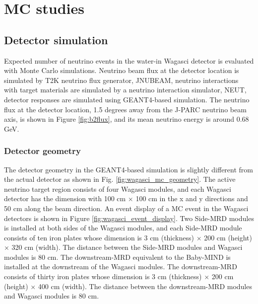 \section{MC studies}
\label{sec:mc_study}

\subsection{Detector simulation}
Expected number of neutrino events in the water-in Wagasci detector is evaluated with Monte Carlo simulations. 
Neutrino beam flux at the detector location is simulated by T2K neutrino flux generator, JNUBEAM, neutrino interactions with target materials are simulated by a neutrino interaction simulator, NEUT, detector responses are simulated using GEANT4-based simulation.
The neutrino flux at the detector location, 1.5 degrees away from the J-PARC neutrino beam axis, is shown in Figure \ref{fig:b2flux}, and its mean neutrino energy is around 0.68 GeV.


\subsubsection{Detector geometry}
The detector geometry in the GEANT4-based simulation is slightly different from the actual detector as shown in Fig. \ref{fig:wagasci_mc_geometry}.
The active neutrino target region consists of four Wagasci modules, and each Wagasci detector has the dimension with 100 cm $\times$ 100 cm in the x and y directions and 50 cm along the beam direction.
An event display of a MC event in the Wagasci detectors is shown in Figure \ref{fig:wagasci_event_display}.
Two Side-MRD modules is installed at both sides of the Wagasci modules, and each Side-MRD module consists of ten iron plates whose dimension is 3 cm (thickness) $\times$ 200 cm (height) $\times$ 320 cm (width). 
The distance between the Side-MRD modules and Wagasci modules is 80 cm.
The downstream-MRD equivalent to the Baby-MIND is installed at the downstream of the Wagasci modules.
The downstream-MRD consists of thirty iron plates whose dimension is  3 cm (thickness) $\times$ 200 cm (height) $\times$ 400 cm (width).
The distance between the downstream-MRD modules and Wagasci modules is 80 cm.

